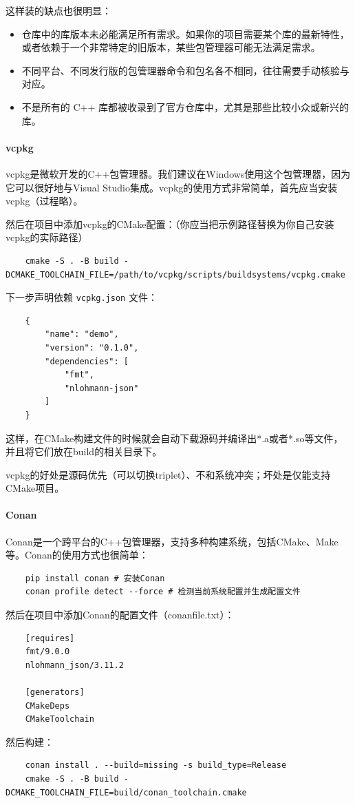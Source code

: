 这样装的缺点也很明显：
\begin{itemize}
    \item 仓库中的库版本未必能满足所有需求。如果你的项目需要某个库的最新特性，或者依赖于一个非常特定的旧版本，某些包管理器可能无法满足需求。
    \item 不同平台、不同发行版的包管理器命令和包名各不相同，往往需要手动核验与对应。
    \item 不是所有的 C++ 库都被收录到了官方仓库中，尤其是那些比较小众或新兴的库。
\end{itemize}

\paragraph{vcpkg} vcpkg是微软开发的C++包管理器。我们建议在Windows使用这个包管理器，因为它可以很好地与Visual Studio集成。vcpkg的使用方式非常简单，首先应当安装vcpkg（过程略）。

然后在项目中添加vcpkg的CMake配置：（你应当把示例路径替换为你自己安装vcpkg的实际路径）
\begin{verbatim}
    cmake -S . -B build -DCMAKE_TOOLCHAIN_FILE=/path/to/vcpkg/scripts/buildsystems/vcpkg.cmake
\end{verbatim}
下一步声明依赖 \texttt{vcpkg.json} 文件：
\begin{verbatim}
    {
        "name": "demo",
        "version": "0.1.0",
        "dependencies": [
            "fmt",
            "nlohmann-json"
        ]
    }
\end{verbatim}
这样，在CMake构建文件的时候就会自动下载源码并编译出*.a或者*.so等文件，并且将它们放在build的相关目录下。

vcpkg的好处是源码优先（可以切换triplet）、不和系统冲突；坏处是仅能支持CMake项目。

\paragraph{Conan} Conan是一个跨平台的C++包管理器，支持多种构建系统，包括CMake、Make等。Conan的使用方式也很简单：
\begin{verbatim}
    pip install conan # 安装Conan
    conan profile detect --force # 检测当前系统配置并生成配置文件
\end{verbatim}
然后在项目中添加Conan的配置文件（conanfile.txt）：
\begin{verbatim}
    [requires]
    fmt/9.0.0
    nlohmann_json/3.11.2

    [generators]
    CMakeDeps
    CMakeToolchain
\end{verbatim}
然后构建：
\begin{verbatim}
    conan install . --build=missing -s build_type=Release
    cmake -S . -B build -DCMAKE_TOOLCHAIN_FILE=build/conan_toolchain.cmake
\end{verbatim}

